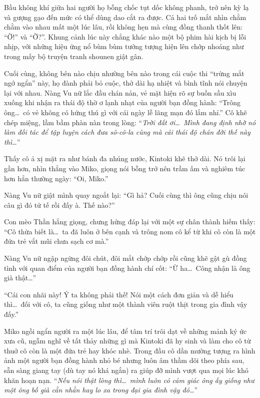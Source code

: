 \documentclass[../main.tex]{subfiles}
\begin{document}
Bầu không khí giữa hai người họ bỗng chốc tụt dốc không phanh, trở nên kỳ lạ và gượng gạo đến mức có thể dùng dao cắt ra được. Cả hai trố mắt nhìn chằm chằm vào nhau mất một lúc lâu, rồi không hẹn mà cùng đồng thanh thốt lên: ``Ờ!'' và ``Ờ?''. Khung cảnh lúc này chẳng khác nào một bộ phim hài kịch bị lỗi nhịp, với những hiệu ứng nổ bùm bùm tưởng tượng hiện lên chớp nhoáng như trong mấy bộ truyện tranh shounen giật gân.


Cuối cùng, không bên nào chịu nhường bên nào trong cái cuộc thi ``trừng mắt ngớ ngẩn'' này, họ đành phải bỏ cuộc, thở dài hạ nhiệt và bình tĩnh nói chuyện lại với nhau. Nàng Vu nữ lắc đầu chán nản, vẻ mặt hiện rõ sự buồn sầu xìu xuống khi nhận ra thái độ thờ ơ lạnh nhạt của người bạn đồng hành: ``Trông ông\dots\ có vẻ không có hứng thú gì với cái ngày lễ lãng mạn đó lắm nhỉ.'' Cô khẽ chép miệng, lầm bầm phàn nàn trong lòng: ``\textit{Trời đất ơi\dots\ Mình đang định nhờ nó làm đối tác để tập luyện cách đưa sô-cô-la cùng mà cái thái độ chán đời thế này thì\dots}''

Thấy cô ả xị mặt ra như bánh đa nhúng nước, Kintoki khẽ thở dài. Nó trôi lại gần hơn, nhìn thẳng vào Miko, giọng nói bỗng trở nên trầm ấm và nghiêm túc hơn hẳn thường ngày: ``Oi, Miko.''

Nàng Vu nữ giật mình quay ngoắt lại: ``Gì hả? Cuối cùng thì ông cũng chịu nói câu gì đó tử tế rồi đấy à. Thế nào?''

Con mèo Thần hắng giọng, chưng hửng đáp lại với một sự chân thành hiếm thấy: ``Cô thừa biết là\dots\ ta đã luôn ở bên cạnh và trông nom cô kể từ khi cô còn là một đứa trẻ vắt mũi chưa sạch cơ mà.''

Nàng Vu nữ ngập ngừng đôi chút, đôi mắt chớp chớp rồi cũng khẽ gật gù đồng tình với quan điểm của người bạn đồng hành chí cốt: ``Ừ ha\dots\ Công nhận là ông già thật\dots''

``Cái con nhãi này! Ý ta không phải thế! Nói một cách đơn giản và dễ hiểu thì\dots\ đối với cô, ta cũng giống như một thành viên ruột thịt trong gia đình vậy đấy.''

Miko ngồi ngẩn người ra một lúc lâu, để tâm trí trôi dạt về những mảnh ký ức xưa cũ, ngẫm nghĩ về tất thảy những gì mà Kintoki đã hy sinh và làm cho cô từ thuở cô còn là một đứa trẻ hay khóc nhè. Trong đầu cô dần mường tượng ra hình ảnh một người bạn đồng hành nhỏ bé nhưng luôn âm thầm dõi theo phía sau, sẵn sàng giang tay (dù tay nó khá ngắn) ra giúp đỡ mình vượt qua mọi lúc khó khăn hoạn nạn. ``\textit{Nếu nói thật lòng thì\dots\ mình luôn có cảm giác ông ấy giống như một ông bố già cằn nhằn hay lo xa trong đại gia đình vậy đó\dots}''
\end{document}
